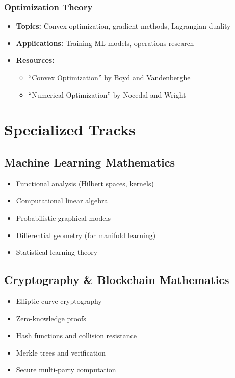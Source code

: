 \documentclass{article}
\begin{document}
\subsubsection{Optimization Theory}
\begin{itemize}[leftmargin=*]
    \item \textbf{Topics:} Convex optimization, gradient methods, Lagrangian duality
    \item \textbf{Applications:} Training ML models, operations research
    \item \textbf{Resources:}
    \begin{itemize}
        \item ``Convex Optimization'' by Boyd and Vandenberghe
        \item ``Numerical Optimization'' by Nocedal and Wright
    \end{itemize}
\end{itemize}

\section{Specialized Tracks}

\subsection{Machine Learning Mathematics}
\begin{itemize}[leftmargin=*]
    \item Functional analysis (Hilbert spaces, kernels)
    \item Computational linear algebra
    \item Probabilistic graphical models
    \item Differential geometry (for manifold learning)
    \item Statistical learning theory
\end{itemize}

\subsection{Cryptography \& Blockchain Mathematics}
\begin{itemize}[leftmargin=*]
    \item Elliptic curve cryptography
    \item Zero-knowledge proofs
    \item Hash functions and collision resistance
    \item Merkle trees and verification
    \item Secure multi-party computation
\end{itemize}
\end{document}
